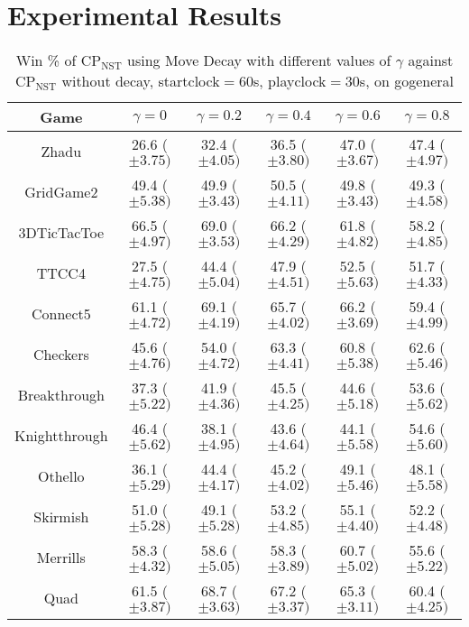\documentclass[journal]{IEEEtran}
\begin{document}
\label{sec:expSetup}
\section{Experimental Results}

\begin{table*}[t]
\caption{Win \% of CP$_{\textrm{NST}}$ using Move Decay with different values of $\gamma$ against CP$_{\textrm{NST}}$ without decay, startclock$=$60s, playclock$=$30s, on gogeneral}
\small
\label{table:exp2}
\centering
\begin{tabular}{|c|c|c|c|c|c|}
\hline
 \textbf{Game} & $ \gamma = 0$ & $ \gamma = 0.2$ & $ \gamma = 0.4$ & $ \gamma = 0.6$ & $ \gamma = 0.8$\\
\hline\hline
Zhadu & 26.6 ($\pm 3.75 )$ & 32.4 ($\pm 4.05)$ & 36.5  ($\pm 3.80)$ & 47.0  ($\pm 3.67) $ & 47.4 ($\pm 4.97)$ \\  
GridGame2 & 49.4  ($\pm 5.38)$ & 49.9  ($\pm 3.43)$ &  50.5 ($\pm 4.11)$ &  49.8 ($\pm 3.43 )$ & 49.3  ($\pm 4.58)$  \\ 
3DTicTacToe & 66.5 ($\pm 4.97)$ & 69.0 ($\pm 3.53)$ &  66.2 ($\pm 4.29)$ & 61.8  ($\pm 4.82)$ &  58.2 ($\pm 4.85)$  \\ 
TTCC4 &  27.5 ($\pm 4.75)$ & 44.4 ($\pm 5.04)$ & 47.9 ($\pm 4.51)$ &  52.5 ($\pm 5.63)$ & 51.7 ($\pm 4.33 )$  \\ 
Connect5 &  61.1 ($\pm 4.72)$ & 69.1 ($\pm 4.19)$ & 65.7 ($\pm 4.02)$ & 66.2 ($\pm 3.69 )$ &  59.4 ($\pm 4.99)$  \\ 
Checkers &  45.6 ($\pm 4.76)$ & 54.0 ($\pm 4.72)$ &  63.3 ($\pm 4.41)$ &  60.8 ($\pm 5.38 )$ & 62.6 ($\pm 5.46)$  \\ 
Breakthrough &  37.3 ($\pm 5.22)$ & 41.9 ($\pm 4.36 )$ & 45.5 ($\pm 4.25)$ & 44.6  ($\pm 5.18)$ & 53.6  ($\pm 5.62)$  \\ 
Knightthrough &  46.4 ($\pm 5.62)$ & 38.1  ($\pm 4.95)$ & 43.6 ($\pm 4.64)$ &  44.1 ($\pm 5.58 )$ & 54.6  ($\pm 5.60)$  \\ 
Othello & 36.1 ($\pm 5.29)$ & 44.4 ($\pm 4.17)$ & 45.2 ($\pm 4.02)$ & 49.1 ($\pm 5.46)$ & 48.1 ($\pm 5.58)$  \\ 
Skirmish &  51.0 ($\pm 5.28)$ & 49.1 ($\pm 5.28 )$ & 53.2 ($\pm 4.85)$ & 55.1 ($\pm 4.40)$ & 52.2  ($\pm 4.48)$  \\ 
Merrills & 58.3 ($\pm 4.32)$ & 58.6 ($\pm 5.05)$ & 58.3  ($\pm 3.89)$ & 60.7 ($\pm 5.02 )$ & 55.6 ($\pm 5.22)$ \\ 
Quad & 61.5  ($\pm 3.87)$ & 68.7 ($\pm 3.63 )$ &  67.2 ($\pm 3.37 )$ & 65.3 ($\pm 3.11)$ & 60.4  ($\pm 4.25)$ \\ 

\end{tabular}
\end{table*}
\end{document}
